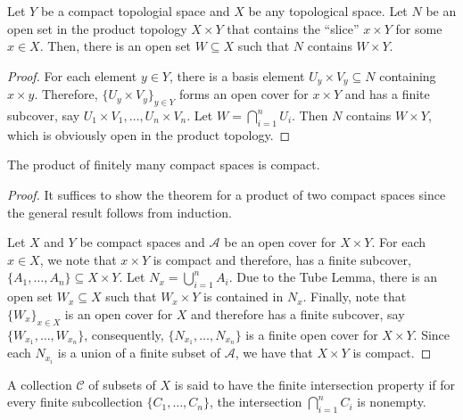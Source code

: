 \begin{lemma}
    Let $Y$ be a compact topologial space and $X$ be any topological space. Let $N$ be an open set in the product topology $X\times Y$ that contains the ``slice'' $x\times Y$ for some $x\in X$. Then, there is an open set $W\subseteq X$ such that $N$ contains $W\times Y$.
\end{lemma}
\begin{proof}
    For each element $y\in Y$, there is a basis element $U_y\times V_y\subseteq N$ containing $x\times y$. Therefore, $\{U_y\times V_y\}_{y\in Y}$ forms an open cover for $x\times Y$ and has a finite subcover, say $U_1\times V_1,\ldots, U_n\times V_n$. Let $W = \bigcap\limits_{i = 1}^n U_i$. Then $N$ contains $W\times Y$, which is obviously open in the product topology.
\end{proof}

\begin{theorem}
    The product of finitely many compact spaces is compact.
\end{theorem}
\begin{proof}
    It suffices to show the theorem for a product of two compact spaces since the general result follows from induction.

    Let $X$ and $Y$ be compact spaces and $\mathscr A$ be an open cover for $X\times Y$. For each $x\in X$, we note that $x\times Y$ is compact and therefore, has a finite subcover, $\{A_1,\ldots,A_n\}\subseteq X\times Y$. Let $N_x = \bigcup\limits_{i = 1}^n A_i$. Due to the Tube Lemma, there is an open set $W_x\subseteq X$ such that $W_x\times Y$ is contained in $N_x$. Finally, note that $\{W_x\}_{x\in X}$ is an open cover for $X$ and therefore has a finite subcover, say $\{W_{x_1},\ldots,W_{x_n}\}$, consequently, $\{N_{x_1},\ldots,N_{x_n}\}$ is a finite open cover for $X\times Y$. Since each $N_{x_i}$ is a union of a finite subset of $\mathscr A$, we have that $X\times Y$ is compact.
\end{proof}

\begin{definition}
    A collection $\mathscr{C}$ of subsets of $X$ is said to have the finite intersection property if for every finite subcollection $\{C_1,\ldots,C_n\}$, the intersection $\bigcap_{i=1}^n C_i$ is nonempty.
\end{definition}

